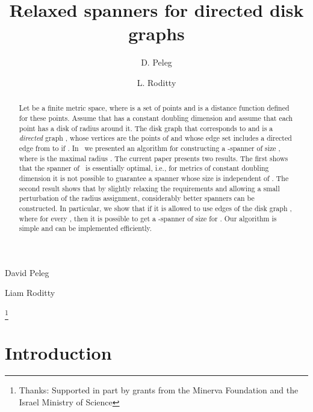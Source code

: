 \documentclass[proceedings]{stacs}
\theoremstyle{plain}\newtheorem{satz}[thm]{Satz}
\theoremstyle{definition}\newtheorem{crucial}[thm]{Crucial Definition}
\begin{document}
\title[Relaxed spanners for directed disk graphs]{Relaxed spanners for directed disk graphs}

\author[lab1]{D. Peleg}{David Peleg}
\address[lab1]{Department of Computer Science and Applied Mathematics,
  \newline The Weizmann Institute of Science, Rehovot 76100, Israel}    


\author[lab2]{L. Roditty}{Liam Roditty}
\address[lab2]{Department of Computer Science, Bar-Ilan University,
\newline Ramat-Gan 52900, Israel}     


\thanks{Thanks: Supported in part by grants from
the Minerva Foundation and the Israel Ministry of Science} 

 




\begin{abstract}
Let  be a finite metric space, where  is a set of
 points and  is a distance function defined for these
points. Assume that  has a constant doubling dimension
 and assume that each point  has a disk of radius
 around it. The disk graph that corresponds to  and
 is a \emph{directed} graph , whose vertices
are the points of  and whose edge set includes a directed edge
from  to  if . In~\cite{PeRo08} we
presented an algorithm for constructing a -spanner of
size , where  is the maximal radius .
The current paper presents two results. The first shows that the
spanner of~\cite{PeRo08} is essentially optimal, i.e., for metrics
of constant doubling dimension it is not possible to guarantee a
spanner whose size is independent of . The second result shows
that by slightly relaxing the requirements and allowing a small
perturbation of the radius assignment, considerably better
spanners can be constructed. In particular, we show that if it is
allowed to use edges of the disk graph , where
 for every , then it
is possible to get a -spanner of size  for
. Our algorithm is simple and can be implemented
efficiently.
\end{abstract}

\maketitle


\section*{Introduction}\label{S:one}
\end{document}

